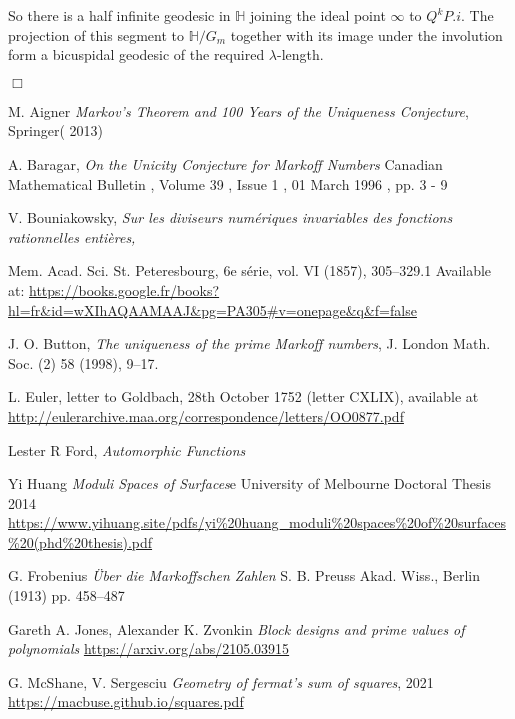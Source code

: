\documentclass[12pt,a4paper]{amsart}
\def\HH{\mathbb{H}}
\def\GG{G_m}
\begin{document}
So there is a half infinite geodesic in $\HH$ joining the ideal point $\infty$
to $Q^kP.i$. The projection of this segment to $\HH/\GG$ together with its image
under the involution form a bicuspidal geodesic of the required
$\lambda$-length.

\hfill$\Box$



M. Aigner
\textit{Markov's Theorem and 100 Years of the Uniqueness Conjecture}, Springer( 2013)


A. Baragar,
\textit{On the Unicity Conjecture for Markoff Numbers}
Canadian Mathematical Bulletin , Volume 39 , Issue 1 , 01 March 1996 , pp. 3 - 9

V. Bouniakowsky, 
\textit{Sur les diviseurs num\'eriques invariables des fonctions rationnelles enti\`eres,}

Mem. Acad. Sci. St. Peteresbourg, 6e s\'erie, vol. VI (1857), 305–329.1 
Available at:
\url{https://books.google.fr/books?hl=fr&id=wXIhAQAAMAAJ&pg=PA305#v=onepage&q&f=false}

J. O. Button, 
\textit{The uniqueness of the prime Markoff numbers},
 J. London Math. Soc.
(2) 58 (1998), 9–17.


L. Euler, letter to Goldbach, 28th October 1752 (letter CXLIX), available at
\url{http://eulerarchive.maa.org/correspondence/letters/OO0877.pdf}

Lester R Ford,
\textit{Automorphic Functions}

Yi Huang
\textit{Moduli Spaces of Surfaces}e University of Melbourne Doctoral Thesis 2014
\url{https://www.yihuang.site/pdfs/yi%20huang_moduli%20spaces%20of%20surfaces%20(phd%20thesis).pdf}

G. Frobenius
\textit{Über die Markoffschen Zahlen}
S. B. Preuss Akad. Wiss., Berlin (1913)
pp. 458–487

Gareth A. Jones, Alexander K. Zvonkin
\textit{Block designs and prime values of polynomials}
\url{https://arxiv.org/abs/2105.03915}

G. McShane, V. Sergesciu
\textit{Geometry of fermat’s sum of squares}, 2021 
\url{https://macbuse.github.io/squares.pdf}
\end{document}
